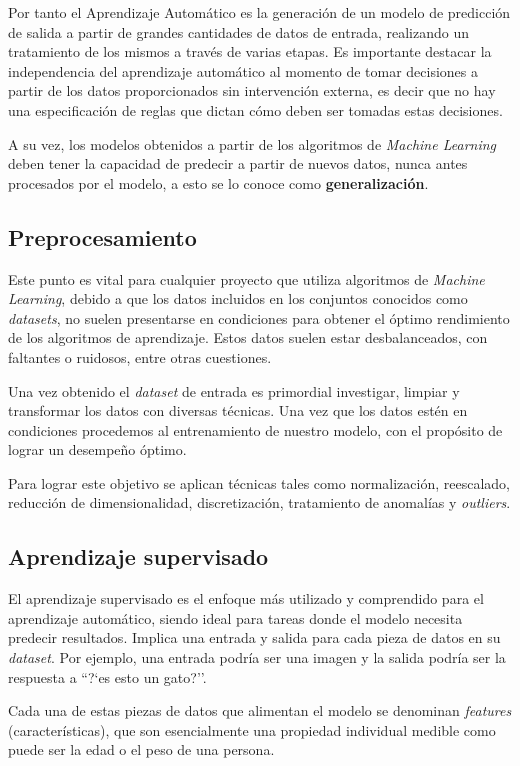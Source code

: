 \documentclass[a4paper,12pt]{article}
\begin{document}
Por tanto el Aprendizaje Automático es la generación de un modelo de predicción de salida a partir de grandes cantidades de datos de entrada, realizando un tratamiento de los mismos a través de varias etapas. Es importante destacar la independencia del aprendizaje automático al momento de tomar decisiones a partir de los datos proporcionados sin intervención externa, es decir que no hay una especificación de reglas que dictan cómo deben ser tomadas estas decisiones.

A su vez, los modelos obtenidos a partir de los algoritmos de \textit{Machine Learning} deben tener la capacidad de predecir a partir de nuevos datos, nunca antes procesados por el modelo, a esto se lo conoce como \textbf{generalización}. 

\subsection{Preprocesamiento} \label{preprocessing}
Este punto es vital para cualquier proyecto que utiliza algoritmos de \textit{Machine Learning}, debido a que los datos incluidos en los conjuntos conocidos como \textit{datasets}, no suelen presentarse en condiciones para obtener el óptimo rendimiento de los algoritmos de aprendizaje. Estos datos suelen estar desbalanceados, con faltantes o ruidosos, entre otras cuestiones. 

Una vez obtenido el \textit{dataset} de entrada es primordial investigar, limpiar y transformar los datos con diversas técnicas. Una vez que los datos estén en condiciones procedemos al entrenamiento de nuestro modelo, con el propósito de lograr un desempeño óptimo.

Para lograr este objetivo se aplican técnicas tales como normalización, reescalado, reducción de dimensionalidad, discretización, tratamiento de anomalías y \textit{outliers}.

\subsection{Aprendizaje supervisado} \label{supervised}
El aprendizaje supervisado es el enfoque más utilizado y comprendido para el aprendizaje automático, siendo ideal para tareas donde el modelo necesita predecir resultados. Implica una entrada y salida para cada pieza de datos en su \textit{dataset}. Por ejemplo, una entrada podría ser una imagen y la salida podría ser la respuesta a ``?`es esto un gato?''.

Cada una de estas piezas de datos que alimentan el modelo se denominan \textit{features} (características), que son esencialmente una propiedad individual medible como puede ser la edad o el peso de una persona.
\end{document}
